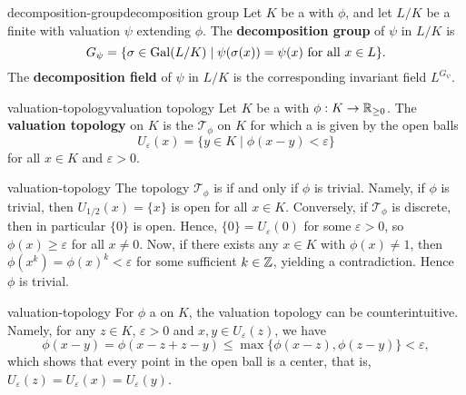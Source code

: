 \begin{topic}{decomposition-group}{decomposition group}
    Let $K$ be a  with  $\phi$, and let $L/K$ be a finite  with valuation $\psi$ extending $\phi$. The \textbf{decomposition group} of $\psi$ in $L/K$ is
    \[ G_\psi = \{ \sigma \in \operatorname{Gal}(L/K) \mid \psi(\sigma(x)) = \psi(x) \textup{ for all } x \in L \} . \]
    The \textbf{decomposition field} of $\psi$ in $L/K$ is the corresponding invariant field $L^{G_\psi}$.
\end{topic}

\begin{topic}{valuation-topology}{valuation topology}
    Let $K$ be a  with  $\phi : K \to \mathbb{R}_{\ge 0}$. The \textbf{valuation topology} on $K$ is the  $\mathcal{T}_\phi$ on $K$ for which a  is given by the open balls
    \[ U_\varepsilon(x) = \{ y \in K \mid \phi(x - y) < \varepsilon \} \]
    for all $x \in K$ and $\varepsilon > 0$.
\end{topic}

\begin{example}{valuation-topology}
    The topology $\mathcal{T}_\phi$ is  if and only if $\phi$ is trivial. Namely, if $\phi$ is trivial, then $U_{1/2}(x) = \{ x \}$ is open for all $x \in K$. Conversely, if $\mathcal{T}_\phi$ is discrete, then in particular $\{ 0 \}$ is open. Hence, $\{ 0 \} = U_\varepsilon(0)$ for some $\varepsilon > 0$, so $\phi(x) \ge \varepsilon$ for all $x \ne 0$. Now, if there exists any $x \in K$ with $\phi(x) \ne 1$, then $\phi(x^k) = \phi(x)^k < \varepsilon$ for some sufficient $k \in \mathbb{Z}$, yielding a contradiction. Hence $\phi$ is trivial.
\end{example}

\begin{example}{valuation-topology}
    For $\phi$ a  on $K$, the valuation topology can be counterintuitive. Namely, for any $z \in K$, $\varepsilon > 0$ and $x, y \in U_\varepsilon(z)$, we have
    \[ \phi(x - y) = \phi(x - z + z - y) \le \max \{ \phi(x - z), \phi(z - y) \} < \varepsilon , \]
    which shows that every point in the open ball is a center, that is, $U_\varepsilon(z) = U_\varepsilon(x) = U_\varepsilon(y)$.
\end{example}

